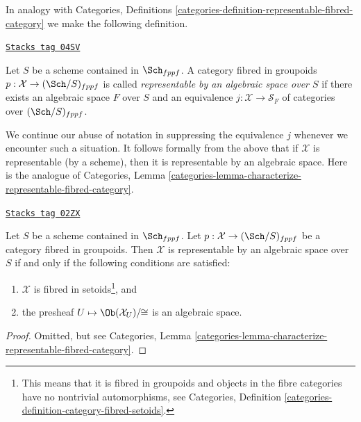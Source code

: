 \medskip\noindent
In analogy with Categories, Definitions
\ref{categories-definition-representable-fibred-category}
we make the following definition.

\begin{definition}
\label{algebraic-definition-representable-by-algebraic-space}
\href{https://stacks.math.columbia.edu/tag/04SV}{\texttt{Stacks tag 04SV}}

Let $S$ be a scheme contained in $\Sch_{fppf}$.
A category fibred in groupoids $p : \mathcal{X} \to (\Sch/S)_{fppf}$
is called {\it representable by an algebraic space over $S$}
if there exists an algebraic space $F$ over $S$ and an equivalence
$j : \mathcal{X} \to \mathcal{S}_F$
of categories over $(\Sch/S)_{fppf}$.
\end{definition}

We continue our abuse of notation in suppressing the equivalence $j$
whenever we encounter such a situation.
It follows formally from the above that if $\mathcal{X}$ is
representable (by a scheme), then it is representable by an
algebraic space. Here is the analogue of
Categories,
Lemma \ref{categories-lemma-characterize-representable-fibred-category}.

\begin{lemma}
\label{algebraic-lemma-characterize-representable-by-space}
\href{https://stacks.math.columbia.edu/tag/02ZX}{\texttt{Stacks tag 02ZX}}

Let $S$ be a scheme contained in $\Sch_{fppf}$.
Let $p : \mathcal{X} \to (\Sch/S)_{fppf}$
be a category fibred in groupoids.
Then $\mathcal{X}$ is representable by an algebraic space over $S$
if and only if the following conditions are satisfied:
\begin{enumerate}
\item $\mathcal{X}$ is fibred in setoids\footnote{This means that
it is fibred in groupoids and objects in the fibre categories
have no nontrivial automorphisms, see Categories,
Definition \ref{categories-definition-category-fibred-setoids}.}, and
\item the presheaf $U \mapsto \Ob(\mathcal{X}_U)/\!\!\cong$ is
an algebraic space.
\end{enumerate}
\end{lemma}

\begin{proof}
Omitted, but see Categories,
Lemma \ref{categories-lemma-characterize-representable-fibred-category}.
\end{proof}

